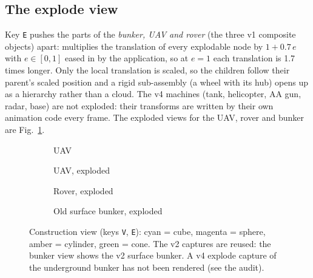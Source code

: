 \subsection{The explode view}
Key \texttt{E} pushes the parts of the \emph{bunker, UAV and rover} (the three v1 composite objects) apart:
 multiplies the translation of every explodable node by $1+0.7\,e$ with $e\in[0,1]$ eased in by the
application, so at $e=1$ each translation is 1.7 times longer. Only the local translation is scaled, so the children
follow their parent's scaled position and a rigid sub-assembly (a wheel with its hub) opens up as a hierarchy rather than
a cloud. The v4 machines (tank, helicopter, AA gun, radar, base) are not exploded: their transforms are written by
their own animation code every frame. The exploded views for the UAV, rover and bunker are Fig.~\ref{fig:explode}.

\begin{figure}[h]
  \centering
  \begin{subfigure}{0.24\linewidth}\caption{UAV}\end{subfigure}
  \begin{subfigure}{0.24\linewidth}\caption{UAV, exploded}\end{subfigure}
  \begin{subfigure}{0.24\linewidth}\caption{Rover, exploded}\end{subfigure}
  \begin{subfigure}{0.24\linewidth}\caption{Old surface bunker, exploded}\end{subfigure}
  \caption{Construction view (keys \texttt{V}, \texttt{E}): cyan = cube, magenta = sphere, amber = cylinder,
  green = cone. The v2 captures are reused: the bunker view shows the v2 surface bunker. A v4 explode capture of the
  underground bunker has not been rendered (see the audit).}
  \label{fig:explode}
\end{figure}

